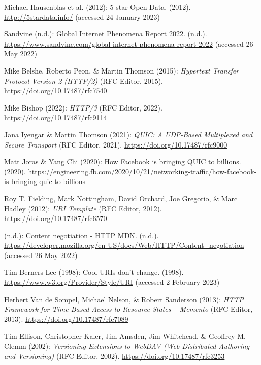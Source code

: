 \begin{thebibliography}{9}
Michael Hausenblas et al. (2012): 5-star {Open Data}. (2012).
\url{http://5stardata.info/} (accessed 24 January 2023)

Sandvine (n.d.): Global {Internet Phenomena Report} 2022. (n.d.).
\url{https://www.sandvine.com/global-internet-phenomena-report-2022}
(accessed 26 May 2022)

Mike Belshe, Roberto Peon, \& Martin Thomson (2015): \emph{Hypertext
{Transfer Protocol Version} 2 ({HTTP}/2)} ({RFC Editor}, 2015).
\url{https://doi.org/10.17487/rfc7540}

Mike Bishop (2022): \emph{{HTTP}/3} ({RFC} Editor, 2022).
\url{https://doi.org/10.17487/rfc9114}

Jana Iyengar \& Martin Thomson (2021): \emph{{QUIC}: {A UDP-Based
Multiplexed} and {Secure Transport}} ({RFC Editor}, 2021).
\url{https://doi.org/10.17487/rfc9000}

Matt Joras \& Yang Chi (2020): How {Facebook} is bringing {QUIC} to
billions. (2020).
\url{https://engineering.fb.com/2020/10/21/networking-traffic/how-facebook-is-bringing-quic-to-billions}

Roy T. Fielding, Mark Nottingham, David Orchard, Joe Gregorio, \& Marc
Hadley (2012): \emph{{URI Template}} ({RFC Editor}, 2012).
\url{https://doi.org/10.17487/rfc6570}

(n.d.): Content negotiation - {HTTP} \textbar{} {MDN}. (n.d.).
\url{https://developer.mozilla.org/en-US/docs/Web/HTTP/Content_negotiation}
(accessed 26 May 2022)

Tim Berners-Lee (1998): Cool {URIs} don't change. (1998).
\url{https://www.w3.org/Provider/Style/URI} (accessed 2 February 2023)

Herbert Van de Sompel, Michael Nelson, \& Robert Sanderson (2013):
\emph{{HTTP Framework} for {Time-Based Access} to {Resource States} --
{Memento}} ({RFC Editor}, 2013).
\url{https://doi.org/10.17487/rfc7089}

Tim Ellison, Christopher Kaler, Jim Amsden, Jim Whitehead, \& Geoffrey
M. Clemm (2002): \emph{Versioning {Extensions} to {WebDAV} ({Web
Distributed Authoring} and {Versioning})} ({RFC Editor}, 2002).
\url{https://doi.org/10.17487/rfc3253}


\end{thebibliography}
